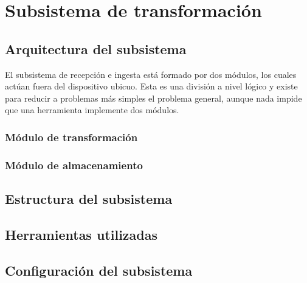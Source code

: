\chapter{Subsistema de transformación}

\section{Arquitectura del subsistema}

El subsistema de recepción e ingesta está formado por dos módulos, los cuales actúan fuera del dispositivo ubicuo. Esta es una división a nivel lógico y existe para reducir a problemas más simples el problema general, aunque nada impide que una herramienta implemente dos módulos.

\subsection{Módulo de transformación}
\subsection{Módulo de almacenamiento}

\section{Estructura del subsistema}

\section{Herramientas utilizadas}

\section{Configuración del subsistema}


